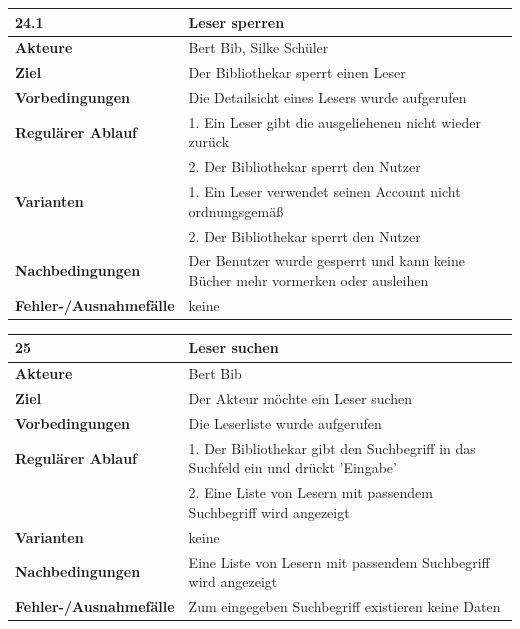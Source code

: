 \documentclass[fontsize=12pt,paper=a4,twoside]{scrartcl}
\begin{document}
\begin{table}[htbp]
\label{24.1}
\begin{tabular}{|l|p{10cm}|}
\hline 
\textbf{24.1} & \textbf{Leser sperren} \\ \hline
\textbf{Akteure} & Bert Bib, Silke Schüler\\ \hline
\textbf{Ziel} & Der Bibliothekar sperrt einen Leser \\ \hline
\textbf{Vorbedingungen} & Die Detailsicht eines Lesers wurde aufgerufen \\ \hline
\textbf{Regulärer Ablauf} & 
1. Ein Leser gibt die ausgeliehenen nicht wieder zurück\\
&2. Der Bibliothekar sperrt den Nutzer\\
\hline
\textbf{Varianten} & 
1. Ein Leser verwendet seinen Account nicht ordnungsgemäß\\
&2. Der Bibliothekar sperrt den Nutzer\\ \hline
\textbf{Nachbedingungen} & Der Benutzer wurde gesperrt und kann keine Bücher mehr vormerken oder 
ausleihen\\ \hline
\textbf{Fehler-/Ausnahmefälle} & keine\\
\hline
\end{tabular}
\end{table}

\begin{table}[htbp]
\label{25}
\begin{tabular}{|l|p{10cm}|}
\hline 
\textbf{25} & \textbf{Leser suchen} \\ \hline
\textbf{Akteure} & Bert Bib\\ \hline
\textbf{Ziel} & Der Akteur möchte ein Leser suchen \\ \hline
\textbf{Vorbedingungen} & Die Leserliste wurde aufgerufen \\ \hline
\textbf{Regulärer Ablauf} & 
1. Der Bibliothekar gibt den Suchbegriff in das Suchfeld ein und drückt 'Eingabe' \\
&2. Eine Liste von Lesern mit passendem Suchbegriff wird angezeigt\\
\hline
\textbf{Varianten} & 
keine \\ \hline
\textbf{Nachbedingungen} & Eine Liste von Lesern mit passendem Suchbegriff wird angezeigt\\ \hline
\textbf{Fehler-/Ausnahmefälle} & Zum eingegeben Suchbegriff existieren keine Daten\\
\hline
\end{tabular}
\end{table}
\end{document}
